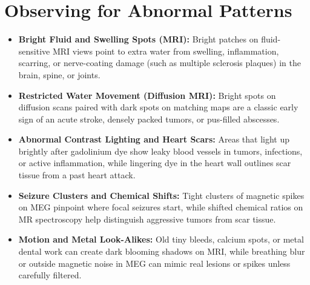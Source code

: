 \section{Observing for Abnormal Patterns}
\begin{itemize}
  \item \textbf{Bright Fluid and Swelling Spots (MRI):} Bright patches on fluid-sensitive MRI views point to extra water from swelling, inflammation, scarring, or nerve-coating damage (such as multiple sclerosis plaques) in the brain, spine, or joints.
  \item \textbf{Restricted Water Movement (Diffusion MRI):} Bright spots on diffusion scans paired with dark spots on matching maps are a classic early sign of an acute stroke, densely packed tumors, or pus-filled abscesses.
  \item \textbf{Abnormal Contrast Lighting and Heart Scars:} Areas that light up brightly after gadolinium dye show leaky blood vessels in tumors, infections, or active inflammation, while lingering dye in the heart wall outlines scar tissue from a past heart attack.
  \item \textbf{Seizure Clusters and Chemical Shifts:} Tight clusters of magnetic spikes on MEG pinpoint where focal seizures start, while shifted chemical ratios on MR spectroscopy help distinguish aggressive tumors from scar tissue.
  \item \textbf{Motion and Metal Look-Alikes:} Old tiny bleeds, calcium spots, or metal dental work can create dark blooming shadows on MRI, while breathing blur or outside magnetic noise in MEG can mimic real lesions or spikes unless carefully filtered.
\end{itemize}

